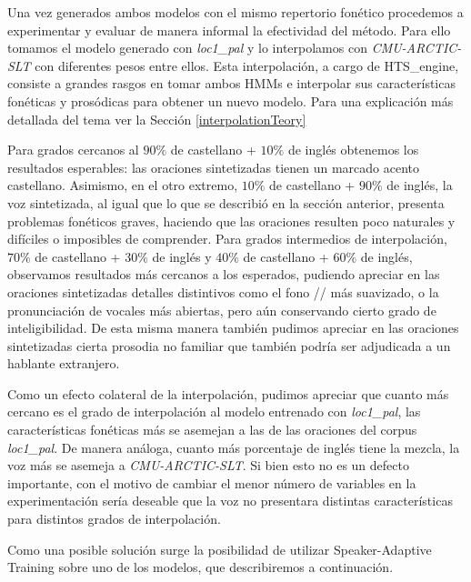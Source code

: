 Una vez generados ambos modelos con el mismo repertorio fonético procedemos a experimentar y evaluar de manera informal la efectividad del método. Para ello tomamos el modelo generado con \textit{loc1\_pal} y lo interpolamos con \textit{CMU-ARCTIC-SLT} con diferentes pesos entre ellos. Esta interpolación, a cargo de HTS\_engine, consiste a grandes rasgos en tomar ambos HMMs e interpolar sus características fonéticas y prosódicas para obtener un nuevo modelo. Para una explicación más detallada del tema ver la Sección \ref{interpolationTeory}

Para grados cercanos al $90\%$ de castellano + $10\%$ de inglés obtenemos los resultados esperables: las oraciones sintetizadas tienen un marcado acento castellano. Asimismo, en el otro extremo, $10\%$ de castellano + $90\%$ de inglés, la voz sintetizada, al igual que lo que se describió en la sección anterior, presenta problemas fonéticos graves, haciendo que las oraciones resulten poco naturales y difíciles o imposibles de comprender. Para grados intermedios de interpolación, $70\%$ de castellano + $30\%$ de inglés y $40\%$ de castellano + $60\%$ de inglés, observamos resultados más cercanos a los esperados, pudiendo apreciar en las oraciones sintetizadas detalles distintivos como el fono // más suavizado, o la pronunciación de vocales más abiertas, pero aún conservando cierto grado de inteligibilidad. De esta misma manera también pudimos apreciar en las oraciones sintetizadas cierta prosodia no familiar que también podría ser adjudicada a un hablante extranjero.  

Como un efecto colateral de la interpolación, pudimos apreciar que cuanto más cercano es el grado de interpolación al modelo entrenado con \textit{loc1\_pal}, las características fonéticas más se asemejan a las de las oraciones del corpus \textit{loc1\_pal}. De manera análoga, cuanto más porcentaje de inglés tiene la mezcla, la voz más se asemeja a \textit{CMU-ARCTIC-SLT}. Si bien esto no es un defecto importante, con el motivo de cambiar el menor número de variables en la experimentación sería deseable que la voz no presentara distintas características para distintos grados de interpolación.

Como una posible solución surge la posibilidad de utilizar Speaker-Adaptive Training sobre uno de los modelos, que describiremos a continuación.